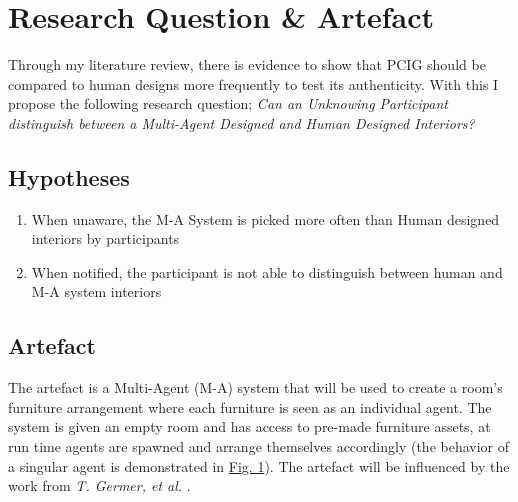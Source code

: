 \section{Research Question \& Artefact}

Through my literature review, there is evidence to show that PCIG should be compared to human designs more frequently to test its authenticity. With this I propose the following research question; \textit{Can an Unknowing Participant distinguish between a Multi-Agent Designed and Human Designed Interiors?}

\subsection{Hypotheses}
\begin{enumerate}
    \item When unaware, the M-A System is picked more often than Human designed interiors by participants
    \item When notified, the participant is not able to distinguish between human and M-A system interiors
\end{enumerate}

\subsection{Artefact}

The artefact is a Multi-Agent (M-A) system that will be used to create a room's furniture arrangement where each furniture is seen as an individual agent. The system is given an empty room and has access to pre-made furniture assets, at run time agents are spawned and arrange themselves accordingly (the behavior of a singular agent is demonstrated in \hyperref[activity-diagram]{Fig. 1}). The artefact will be influenced by the work from \textit{T. Germer, et al.} \cite{real-time-walkthroughs}.

